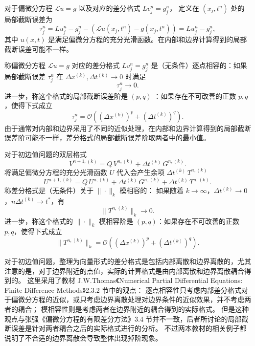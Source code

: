 \begin{definition}[局部截断误差]
    对于偏微分方程 $\mathcal{L} u = g$ 以及对应的差分格式 $L v_j^n = g_j^n$，
    定义在 $(x_j,t^n)$ 处的局部截断误差为
    \[
        \tau_j^n = L u_j^n - g_j^n - (\mathcal{L}u(x_j,t^n) - g(x_j,t^n)) = L u_j^n - g_j^n,
    \]
    其中 $u(x,t)$ 是满足偏微分方程的充分光滑函数。在内部和边界计算得到的局部截断误差可能不一样。
\end{definition}

\begin{definition}[逐点相容性]
    称偏微分方程 $\mathcal{L} u = g$ 对应的差分格式 $L v_j^n = g_j^n$ 是（无条件）逐点相容的：如果局部截断误差 $\tau_j^n$ 在
    $\Delta x^{(k)},\Delta t^{(k)}\to 0$ 时满足
    \[
        \tau_j^n \to 0.
    \]
    进一步，称这个格式的局部截断误差阶是 $(p,q)$ ：如果存在不可改善的正数 $p,q$，使得下式成立
    \[
        \tau_j^n = \mathcal{O}((\Delta x^{(k)})^p + (\Delta t^{(k)})^q).
    \]
    由于通常对内部和边界采用了不同的近似处理，在内部和边界计算得到的局部截断误差阶可能不一样，差分格式的局部截断误差阶取两者中的最小值。
\end{definition}



\begin{definition}[模相容性]\label{def:ib-norm-consistency}
    对于初边值问题的双层格式
    \[
        V^{n+1,(k)} = Q \, V^{n,(k)} + \Delta t^{(k)}\, G^{n,(k)}.
    \]
    将满足偏微分方程的充分光滑函数 $U$ 代入会产生余项 $\Delta t^{(k)}\, T^{n,(k)}$
    \[
        U^{n+1,(k)} = Q \, U^{n,(k)} + \Delta t^{(k)}\, G^{n,(k)} + \Delta t^{(k)}\, T^{n,(k)}.
    \]
    称差分格式是（无条件）关于 $\|\cdot\|_k$ 模相容的：
    如果随着 $k \to \infty$，$\Delta t^{(k)} \to 0$，$n \Delta t^{(k)} \to t^*$，有
    \[
        \|T^{n,(k)}\|_{k} \to 0.
    \]
    进一步，称这个格式的 $\|\cdot\|_k$ 模相容阶是 $(p,q)$：如果存在不可改善的正数 $p,q$，使得下式成立
    \[
        \|T^{n,(k)}\|_{k} = \mathcal{O}((\Delta x^{(k)})^p + (\Delta t^{(k)})^q).
    \]
\end{definition}

\begin{remark}
    对于初边值问题，整理为向量形式的差分格式是包括内部离散和边界离散的，尤其注意的是，对于边界附近的点值，实际的计算格式是由内部离散和边界离散耦合得到的。
    这里采用了教材 J.W.Thomas《Numerical Partial Differential Equations: Finite Difference Methods》2.3.2 节中的观点：
    逐点相容性只考虑内部差分格式对于偏微分方程的近似，或只考虑边界离散处理对边界条件的近似效果，并不考虑两者的耦合；
    模相容性则是考虑两者在边界附近的耦合得到的实际格式。
    但是这种观点与张强《偏微分方程的有限差分方法》3.4 节并不一致，后者所讨论的局部截断误差是针对两者耦合之后的实际格式进行的分析。
    不过两本教材的相关例子都说明了不合适的边界离散会导致整体出现掉阶现象。
\end{remark}

